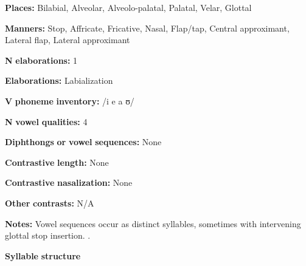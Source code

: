 \begin{styleBody}
\textbf{Places:} Bilabial, Alveolar, Alveolo-palatal, Palatal, Velar, Glottal
\end{styleBody}

\begin{styleBody}
\textbf{Manners:} Stop, Affricate, Fricative, Nasal, Flap/tap, Central approximant, Lateral flap, Lateral approximant
\end{styleBody}

\begin{styleBody}
\textbf{N} \textbf{elaborations:} 1
\end{styleBody}

\begin{styleBody}
\textbf{Elaborations:} Labialization
\end{styleBody}

\begin{styleBody}
\textbf{V} \textbf{phoneme} \textbf{inventory:} /i e a ʊ/
\end{styleBody}

\begin{styleBody}
\textbf{N} \textbf{vowel} \textbf{qualities:} 4
\end{styleBody}

\begin{styleBody}
\textbf{Diphthongs} \textbf{or} \textbf{vowel} \textbf{sequences:} None
\end{styleBody}

\begin{styleBody}
\textbf{Contrastive} \textbf{length:} None
\end{styleBody}

\begin{styleBody}
\textbf{Contrastive} \textbf{nasalization:} None
\end{styleBody}

\begin{styleBody}
\textbf{Other} \textbf{contrasts:} N/A
\end{styleBody}

\begin{styleBody}
\textbf{Notes:} Vowel sequences occur as distinct syllables, sometimes with intervening glottal stop insertion. \citep[28-9]{Guillaume2008}.
\end{styleBody}

\begin{styleBody}
\textbf{Syllable} \textbf{structure}
\end{styleBody}

